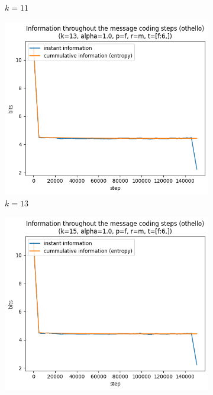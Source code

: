 \documentclass{article}
\begin{document}
\begin{figure}
\begin{subfigure}[b]{0.3\textwidth}
\begin{center}
        \end{center}
        \caption{$k = 11$}
        \label{fig:results-pattern-size-other-11}
    \end{subfigure}
    \hfill
    \begin{subfigure}[b]{0.3\textwidth}
        \begin{center}
            \includegraphics[width=1.0\linewidth]{../scripts/images/othello_13_1.0_f_m_[f:6,].png}
        \end{center}
        \caption{$k = 13$}
        \label{fig:results-pattern-size-other-13}
    \end{subfigure}
    \hfill
    \begin{subfigure}[b]{0.3\textwidth}
        \begin{center}
            \includegraphics[width=1.0\linewidth]{../scripts/images/othello_15_1.0_f_m_[f:6,].png}

\end{center}
\end{subfigure}
\end{figure}
\end{document}
